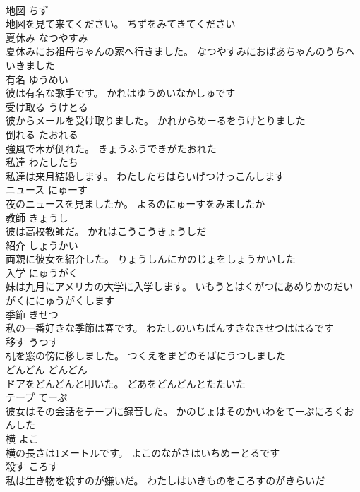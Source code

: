 \documentclass[8pt]{extreport}
\begin{document}
\begin{CJK}{UTF8}{min}
\\	地図	ちず	
\\	地図を見て来てください。	ちずをみてきてください	
\\	夏休み	なつやすみ	
\\	夏休みにお祖母ちゃんの家へ行きました。	なつやすみにおばあちゃんのうちへいきました	
\\	有名	ゆうめい	
\\	彼は有名な歌手です。	かれはゆうめいなかしゅです	
\\	受け取る	うけとる	
\\	彼からメールを受け取りました。	かれからめーるをうけとりました	
\\	倒れる	たおれる	
\\	強風で木が倒れた。	きょうふうできがたおれた	
\\	私達	わたしたち	
\\	私達は来月結婚します。	わたしたちはらいげつけっこんします	
\\	ニュース	にゅーす	
\\	夜のニュースを見ましたか。	よるのにゅーすをみましたか	
\\	教師	きょうし	
\\	彼は高校教師だ。	かれはこうこうきょうしだ	
\\	紹介	しょうかい	
\\	両親に彼女を紹介した。	りょうしんにかのじょをしょうかいした	
\\	入学	にゅうがく	
\\	妹は九月にアメリカの大学に入学します。	いもうとはくがつにあめりかのだいがくににゅうがくします	
\\	季節	きせつ	
\\	私の一番好きな季節は春です。	わたしのいちばんすきなきせつははるです	
\\	移す	うつす	
\\	机を窓の傍に移しました。	つくえをまどのそばにうつしました	
\\	どんどん	どんどん	
\\	ドアをどんどんと叩いた。	どあをどんどんとたたいた	
\\	テープ	てーぷ	
\\	彼女はその会話をテープに録音した。	かのじょはそのかいわをてーぷにろくおんした	
\\	横	よこ	
\\	横の長さは1メートルです。	よこのながさはいちめーとるです	
\\	殺す	ころす	
\\	私は生き物を殺すのが嫌いだ。	わたしはいきものをころすのがきらいだ	

\end{CJK}
\end{document}
